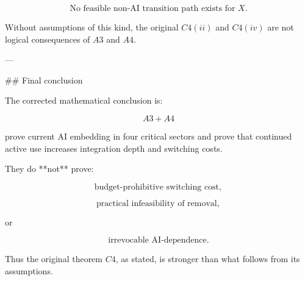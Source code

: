 \[
\text{No feasible non-AI transition path exists for }X.
\]

Without assumptions of this kind, the original \(C4(ii)\) and \(C4(iv)\) are not logical consequences of \(A3\) and \(A4\).

---

## Final conclusion

The corrected mathematical conclusion is:

\[
A3+A4
\]

prove current AI embedding in four critical sectors and prove that continued active use increases integration depth and switching costs.

They do **not** prove:

\[
\text{budget-prohibitive switching cost},
\]

\[
\text{practical infeasibility of removal},
\]

or

\[
\text{irrevocable AI-dependence}.
\]

Thus the original theorem \(C4\), as stated, is stronger than what follows from its assumptions.